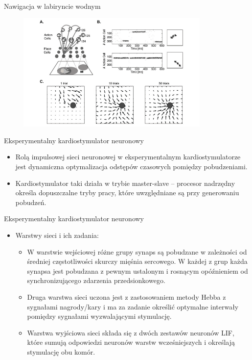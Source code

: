\documentclass{beamer}
\begin{document}
\begin{frame}{Nawigacja w labiryncie wodnym}

\begin{figure}[H]
  \centering
    \includegraphics[width=0.85\textwidth]{water_maze.png}
\end{figure}

\end{frame}


\begin{frame}{Eksperymentalny kardiostymulator neuronowy}

\begin{itemize}

\item Rolą impulsowej sieci neuronowej w eksperymentalnym kardiostymulatorze jest dynamiczna optymalizacja odstępów czasowych pomiędzy pobudzeniami. 
\item Kardiostymulator taki działa w trybie master-slave -- procesor nadrzędny określa dopuszczalne tryby pracy, które uwzględniane są przy generowaniu pobudzeń.

\end{itemize}

\end{frame}


\begin{frame}{Eksperymentalny kardiostymulator neuronowy}

\begin{itemize}
\item Warstwy sieci i ich zadania:
\begin{itemize}

\item W warstwie wejściowej różne grupy synaps są pobudzane w zależności od średniej częstotliwości skurczy mięśnia sercowego. W każdej z grup każda synapsa jest pobudzana z pewnym ustalonym i rosnącym opóźnieniem od synchronizującego zdarzenia przedsionkowego. 
\item Druga warstwa sieci uczona jest z zastosowaniem metody Hebba z sygnałami nagrody/kary i ma za zadanie określić optymalne interwały pomiędzy sygnałami wyzwalającymi stymulację.
\item Warstwa wyjściowa sieci składa się z dwóch zestawów neuronów LIF, które sumują odpowiedzi neuronów warstw wcześniejszych i określają stymulację obu komór.

\end{itemize}
\end{itemize}

\end{frame}
\end{document}
